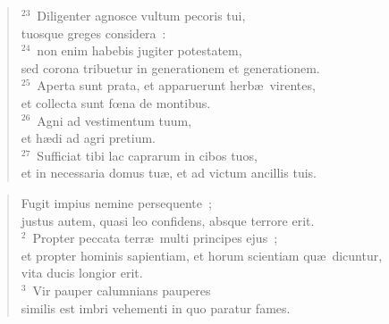 \begin{flushleft}\begin{verse}${}^{23}$~Diligenter agnosce vultum pecoris tui,\\ tuosque greges considera~:\\
${}^{24}$~non enim habebis jugiter potestatem,\\ sed corona tribuetur in generationem et generationem.\\
${}^{25}$~Aperta sunt prata, et apparuerunt herb\ae\ virentes,\\ et collecta sunt fœna de montibus.\\
${}^{26}$~Agni ad vestimentum tuum,\\ et h\ae di ad agri pretium.\\
${}^{27}$~Sufficiat tibi lac caprarum in cibos tuos,\\ et in necessaria domus tu\ae , et ad victum ancillis tuis.\end{verse}\end{flushleft}


\begin{flushleft}\begin{verse}\vspace{-19pt}\hspace{6pt}Fugit impius nemine persequente~;\\\hspace{6pt} justus autem, quasi leo confidens, absque terrore erit.\\
${}^{2}$~Propter peccata terr\ae\ multi principes ejus~;\\ et propter hominis sapientiam, et horum scientiam qu\ae\ dicuntur,\\ vita ducis longior erit.\\
${}^{3}$~Vir pauper calumnians pauperes\\ similis est imbri vehementi in quo paratur fames.\end{verse}\end{flushleft}


